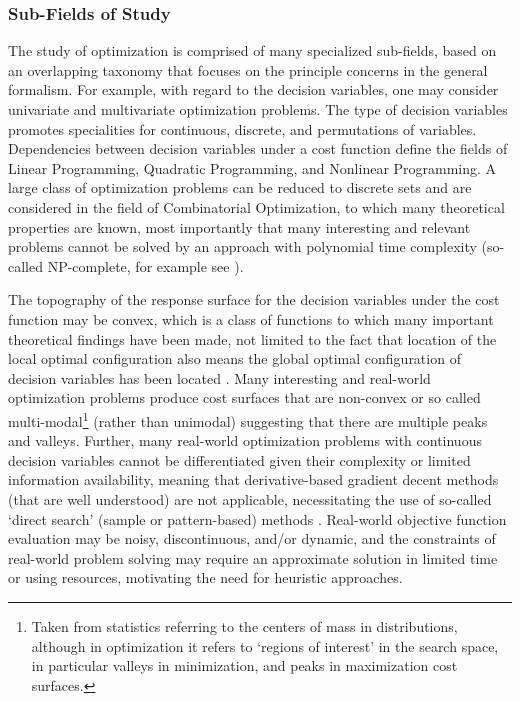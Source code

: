 \begin{bibunit}
\subsubsection{Sub-Fields of Study}
The study of optimization is comprised of many specialized sub-fields, based on an overlapping taxonomy that focuses on the principle concerns in the general formalism. 
For example, with regard to the decision variables, one may consider univariate and multivariate optimization problems. The type of decision variables promotes specialities for continuous, discrete, and permutations of variables. Dependencies between decision variables under a cost function define the fields of Linear Programming, Quadratic Programming, and Nonlinear Programming. A large class of optimization problems can be reduced to discrete sets and are considered in the field of Combinatorial Optimization, to which many theoretical properties are known, most importantly that many interesting and relevant problems cannot be solved by an approach with polynomial time complexity (so-called NP-complete, for example see \cite{Papadimitriou1998}).

The topography of the response surface for the decision variables under the cost function may be convex, which is a class of functions to which many important theoretical findings have been made, not limited to the fact that location of the local optimal configuration also means the global optimal configuration of decision variables has been located \cite{Boyd2004}. Many interesting and real-world optimization problems produce cost surfaces that are non-convex or so called multi-modal\footnote{Taken from statistics referring to the centers of mass in distributions, although in optimization it refers to `regions of interest' in the search space, in particular valleys in minimization, and peaks in maximization cost surfaces.} (rather than unimodal) suggesting that there are multiple peaks and valleys. Further, many real-world optimization problems with continuous decision variables cannot be differentiated given their complexity or limited information availability, meaning that derivative-based gradient decent methods (that are well understood) are not applicable, necessitating the use of so-called `direct search' (sample or pattern-based) methods \cite{Lewis2000}. Real-world objective function evaluation may be noisy, discontinuous, and/or dynamic, and the constraints of real-world problem solving may require an approximate solution in limited time or using resources, motivating the need for heuristic approaches.



\end{bibunit}
